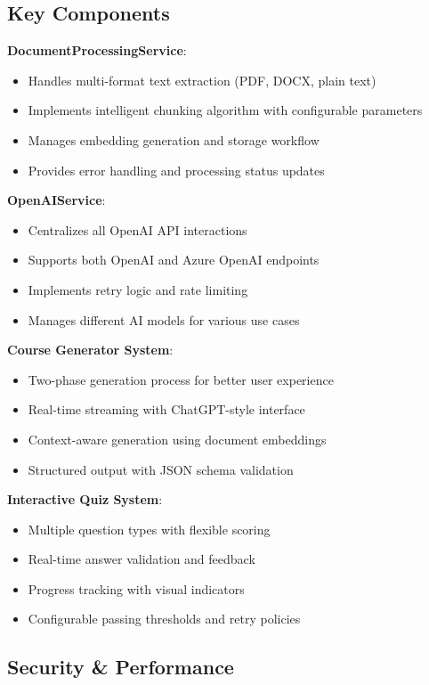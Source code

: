 \documentclass[a4paper,11pt]{article}
\begin{document}
\subsection{Key Components}

\textbf{DocumentProcessingService}:
\begin{itemize}
    \item Handles multi-format text extraction (PDF, DOCX, plain text)
    \item Implements intelligent chunking algorithm with configurable parameters
    \item Manages embedding generation and storage workflow
    \item Provides error handling and processing status updates
\end{itemize}

\textbf{OpenAIService}:
\begin{itemize}
    \item Centralizes all OpenAI API interactions
    \item Supports both OpenAI and Azure OpenAI endpoints
    \item Implements retry logic and rate limiting
    \item Manages different AI models for various use cases
\end{itemize}

\textbf{Course Generator System}:
\begin{itemize}
    \item Two-phase generation process for better user experience
    \item Real-time streaming with ChatGPT-style interface
    \item Context-aware generation using document embeddings
    \item Structured output with JSON schema validation
\end{itemize}

\textbf{Interactive Quiz System}:
\begin{itemize}
    \item Multiple question types with flexible scoring
    \item Real-time answer validation and feedback
    \item Progress tracking with visual indicators
    \item Configurable passing thresholds and retry policies
\end{itemize}

\subsection{Security \& Performance}
\end{document}

